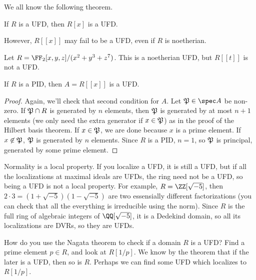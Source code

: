  We all know the following theorem.
 \begin{theorem}[Gauss]
   If $R$ is a UFD, then $R[x]$ is a UFD.
 \end{theorem}
 However, $R[[x]]$ may fail to be a UFD, even if $R$ is noetherian.
 \begin{example}
   Let $R=\FF_2[x,y,z]/(x^2+y^3+z^7)$. This is a noetherian UFD, but $R[[t]]$ is not a
   UFD.
 \end{example}
 \begin{theorem}
   If $R$ is a PID, then $A=R[[x]]$ is a UFD.
 \end{theorem}
 \begin{proof}
   Again, we'll check that second condition for $A$. Let $\P\in\spec A$ be non-zero. If
   $\P\cap R$ is generated by $n$ elements, then $\P$ is generated by at most $n+1$
   elements (we only need the extra generator if $x\in \P$) as in the proof of the
   Hilbert basis theorem. If $x\in \P$, we are done because $x$ is a prime element. If
   $x\not\in \P$, $\P$ is generated by $n$ elements. Since $R$ is a PID, $n=1$, so $\P$
   is principal, generated by some prime element.
 \end{proof}
 \setcounter{lecture}{38}

 Normality is a local property. If you localize a UFD, it is still a UFD, but if all the
 localizations at maximal ideals are UFDs, the ring need not be a UFD, so being a UFD is
 not a local property. For example, $R=\ZZ[\sqrt{-5}]$, then $2\cdot
 3=(1+\sqrt{-5})(1-\sqrt{-5})$ are two essensially different factorizations (you can
 check that all the everything is irreducible using the norm). Since $R$ is the full ring
 of algebraic integers of $\QQ[\sqrt{-5}]$, it is a Dedekind domain, so all its
 localizations are DVRs, so they are UFDs.

 How do you use the Nagata theorem to check if a domain $R$ is a UFD? Find a prime
 element $p\in R$, and look at $R[1/p]$. We know by the theorem that if the later is a
 UFD, then so is $R$. Perhaps we can find some UFD which localizes to $R[1/p]$.

